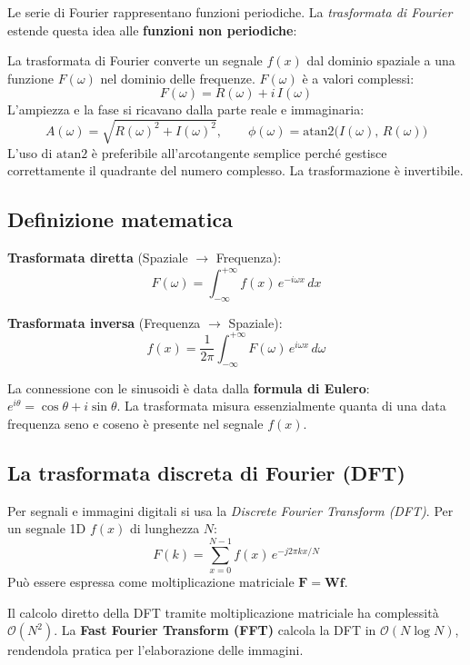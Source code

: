 \documentclass[12pt, a4paper]{report}
\begin{document}
Le serie di Fourier rappresentano funzioni periodiche.  La \textit{trasformata di
Fourier} estende questa idea alle \textbf{funzioni non periodiche}:

\begin{defbox}
La trasformata di Fourier converte un segnale $f(x)$ dal dominio spaziale a una
funzione $F(\omega)$ nel dominio delle frequenze.  $F(\omega)$ è a valori complessi:
\[
  F(\omega) = R(\omega) + i\,I(\omega)
\]
L'ampiezza e la fase si ricavano dalla parte reale e immaginaria:
\[
  A(\omega) = \sqrt{R(\omega)^2 + I(\omega)^2}, \qquad
  \phi(\omega) = \mathrm{atan2}\!\bigl(I(\omega),\,R(\omega)\bigr)
\]
L'uso di $\mathrm{atan2}$ è preferibile all'arcotangente semplice perché gestisce
correttamente il quadrante del numero complesso.  La trasformazione è invertibile.
\end{defbox}

\subsection{Definizione matematica}

\textbf{Trasformata diretta} (Spaziale $\to$ Frequenza):
\[
  F(\omega) = \int_{-\infty}^{+\infty} f(x)\,e^{-i\omega x}\,dx
\]

\textbf{Trasformata inversa} (Frequenza $\to$ Spaziale):
\[
  f(x) = \frac{1}{2\pi}\int_{-\infty}^{+\infty} F(\omega)\,e^{i\omega x}\,d\omega
\]

La connessione con le sinusoidi è data dalla \textbf{formula di Eulero}:
$e^{i\theta} = \cos\theta + i\sin\theta$.
La trasformata misura essenzialmente quanta di una data frequenza seno e coseno è
presente nel segnale $f(x)$.

\subsection{La trasformata discreta di Fourier (DFT)}

Per segnali e immagini digitali si usa la \textit{Discrete Fourier Transform (DFT)}.
Per un segnale 1D $f(x)$ di lunghezza $N$:
\[
  F(k) = \sum_{x=0}^{N-1} f(x)\,e^{-j2\pi kx/N}
\]
Può essere espressa come moltiplicazione matriciale $\mathbf{F} = \mathbf{W}\mathbf{f}$.

\begin{notebox}
Il calcolo diretto della DFT tramite moltiplicazione matriciale ha complessità
$\mathcal{O}(N^2)$.  La \textbf{Fast Fourier Transform (FFT)} calcola la DFT in
$\mathcal{O}(N\log N)$, rendendola pratica per l'elaborazione delle immagini.
\end{notebox}
\end{document}
